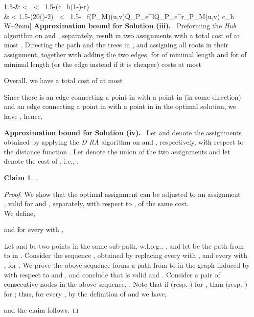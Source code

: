 \documentclass[a4paper]{article}
\newtheorem{claim}{Claim}
\begin{document}
\begin{algorithm}[htp]
\begin{algorithmic}
1.5-\epsilon & <  \ < \ 1.5-(c_h(1-)-r) \\
						 & <	1.5-(20\epsilon()-2\epsilon) \ <	\ 1.5-\epsilon \qquad  \qquad \Rightarrow\ 						 
f(P_M)(u,v)\in Q_{P_{e^l}}\cup Q_{P_{e^r}}\delta_{P_M}(u,v) \leq c_h W\sim2mm]
\noindent
\textbf{Approximation bound for Solution (iii).} \
Preforming the \emph{Hub} algorithm on  and , separately, result
in two assignments with a total cost of at most .
Directing the path  and the trees in , and assigning all roots in  their assignment, 
together with adding the two edges,  for  of minimal length
and  for  of minimal length 
(or the edge  instead if it is cheaper)
costs at most \

Overall, we have a total cost of at most \


Since there is an edge connecting a point in  with a point in  (in some direction)
and an edge connecting a point in  with a point in  in
the optimal solution, we have ,
hence,



\noindent
\textbf{Approximation bound for Solution (iv).} \
Let  and  
denote the assignments obtained by applying the \emph{D RA} algorithm 
on  and , respectively, with respect to the distance function . 
Let  denote the union of the two assignments
and let  denote the cost of , i.e., .
\begin{claim}\label{cl:OPT'}
.
\end{claim}
\begin{proof}
We show that the optimal assignment  can be adjusted to an assignment\\
\mbox{}, valid for  and , separately, with respect to , of the same cost.\\
We define,

and for every  with , \ \  

Let  and  be two points in the same sub-path, w.l.o.g., , 
and let  be the path from  to  in .
Consider the sequence , obtained by replacing every  with ,
and every  with , for .
We prove the above sequence forms a path from  to  
in the graph induced by  with respect to  and , and conclude that  is valid and .
Consider a pair of consecutive nodes in the above sequence, . 
Note that if  (resp. ) for , than  (resp. ) for ; thus,
for every , by the definition of  and  we have, 
 
and the claim follows.
\end{proof}


\end{algorithmic}
\end{algorithm}
\end{document}
